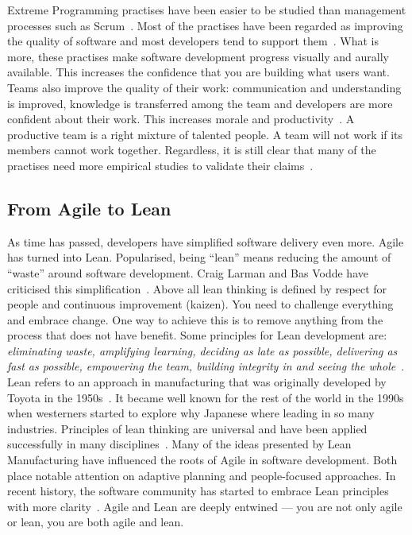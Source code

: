 \documentclass[english]{tktltiki2}
\begin{document}
Extreme Programming practises have been easier to be studied than management processes such as Scrum~\cite{DD08, DNB12, KRM13}. Most of the practises have been regarded as improving the quality of software and most developers tend to support them~\cite{DD08, SS10}. What is more, these practises make software development progress visually and aurally available. This increases the confidence that you are building what users want. Teams also improve the quality of their work: communication and understanding is improved, knowledge is transferred among the team and developers are more confident about their work. This increases morale and productivity~\cite{SS10}. A productive team is a right mixture of talented people. A team will not work if its members cannot work together. Regardless, it is still clear that many of the practises need more empirical studies to validate their claims~\cite{DD08}.

\subsection{From Agile to Lean}

As time has passed, developers have simplified software delivery even more. Agile has turned into Lean. Popularised, being “lean” means reducing the amount of “waste” around software development. Craig Larman and Bas Vodde have criticised this simplification~\cite{LV09}. Above all lean thinking is defined by respect for people and continuous improvement (kaizen). You need to challenge everything and embrace change. One way to achieve this is to remove anything from the process that does not have benefit. Some principles for Lean development are: \emph{eliminating waste, amplifying learning, deciding as late as possible, delivering as fast as possible, empowering the team, building integrity in and seeing the whole}~\cite{PP03}. Lean refers to an approach in manufacturing that was originally developed by Toyota in the 1950s~\cite{Fow08}. It became well known for the rest of the world in the 1990s when westerners started to explore why Japanese where leading in so many industries. Principles of lean thinking are universal and have been applied successfully in many disciplines~\cite{Pop02}. Many of the ideas presented by Lean Manufacturing have influenced the roots of Agile in software development. Both place notable attention on adaptive planning and people-focused approaches. In recent history, the software community has started to embrace Lean principles with more clarity~\cite{Fow08}. Agile and Lean are deeply entwined — you are not only agile or lean, you are both agile and lean.
\end{document}
